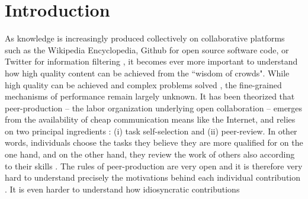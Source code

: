 \section{Introduction}
As knowledge is increasingly produced collectively on collaborative platforms such as the Wikipedia Encyclopedia, Github for open source software code, or Twitter for information filtering \cite{}, it becomes ever more important to understand how high quality content can be achieved from the ``wisdom of crowds". While  high quality can be achieved \cite{giles2005internet} and complex problems solved \cite{cooper2010}, the fine-grained mechanisms of performance remain largely unknown. It has been theorized that peer-production -- the labor organization underlying open collaboration -- emerges from the availability of cheap communication means like the Internet, and relies on two principal ingredients : (i) task self-selection and (ii) peer-review. In other words, individuals choose the tasks they believe they are more qualified for on the one hand, and on the other hand, they review the work of others also according to their skills \cite{benkler2002}. The rules of peer-production are very open and it is therefore very hard to understand precisely the motivations behind each individual contribution \cite{vonKrogh2012}. It is even harder to understand how idiosyncratic contributions 




